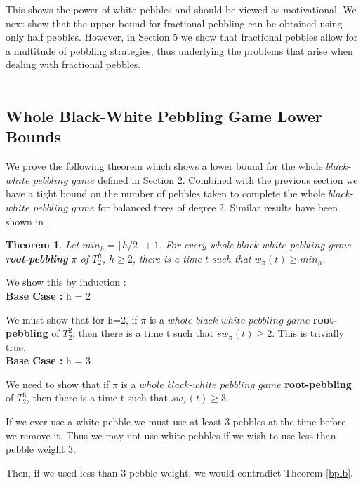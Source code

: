 \documentclass[12pt]{article}
\newtheorem{theorem}{Theorem}[subsection]
\begin{document}
This shows the power of white pebbles and should be viewed as motivational. We next show that the upper bound for fractional pebbling can be obtained using only half pebbles. However, in Section 5 we show that fractional pebbles allow for a multitude of pebbling strategies, thus underlying the problems that arise when dealing with fractional pebbles. \\\\






\subsection{Whole Black-White Pebbling Game Lower Bounds} 

We prove the following theorem which shows a lower bound for the whole $black$-$white$ $pebbling$ $game$ defined in Section 2. Combined with the previous section we have a tight bound on the number of pebbles taken to complete the whole $black$-$white$ $pebbling$ $game$ for balanced trees of degree 2. Similar results have been shown in \cite{c:pebjournal}.\\

\begin{theorem}
Let $min_h = \lceil h/2 \rceil + 1$.
For every whole $black$-$white$ $pebbling$ $game$ {\bf root-pebbling} $\pi$ of $T^h_2$, $h \geq 2$, there is a time $t$ such
that $w_\pi(t) \ge min_h$.
\end{theorem}

\noindent
We show this by induction : \\

\noindent
{\bf Base Case :} h = 2

We must show that for h=2, if $\pi$ is a $whole$ $black$-$white$ $pebbling$ $game$ {\bf root-pebbling} of $T_2^2$, then there is a time t such that $sw_\pi(t) \geq 2$. This is trivially true.\\

\noindent
{\bf Base Case :} h = 3

We need to show that if $\pi$ is a $whole$ $black$-$white$ $pebbling$ $game$ {\bf root-pebbling} of $T_2^3$, then there is a time t such that $sw_\pi(t) \geq 3$.
 
If we ever use a white pebble we must use at least 3 pebbles at the time before we remove it. Thus we may not use white pebbles if we wish to use less than pebble weight 3.

Then, if we used less than 3 pebble weight, we would contradict Theorem \ref{bplb}.\\
\end{document}
